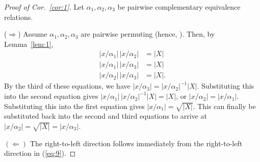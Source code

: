 \begin{proof}[Proof of Cor.~\ref{cor:1}]
Let $\alpha_1, \alpha_2, \alpha_3$ be pairwise complementary equivalence relations.

\noindent ($\Rightarrow$)
Assume $\alpha_1, \alpha_2, \alpha_3$ are pairwise permuting (hence, \pppc). Then, by Lemma~\ref{lem:1},
\begin{align*}
|x/\alpha_1|\, |x/\alpha_2| &= |X|\\
|x/\alpha_1|\, |x/\alpha_3| &= |X|\\
|x/\alpha_2|\, |x/\alpha_3| &= |X|.
\end{align*}
By the third of these equations, we have 
$|x/\alpha_3| = |x/\alpha_2|^{-1} |X|$.
Substituting this into the second equation gives 
$|x/\alpha_1|\, |x/\alpha_2|^{-1} |X| = |X|$,
or $|x/\alpha_2|= |x/\alpha_1|$.
Substituting this into the first equation gives 
$|x/\alpha_1|= \sqrt{|X|}$. This can finally be substituted
back into the second and third
equations to arrive at $|x/\alpha_2|= \sqrt{|X|} = |x/\alpha_3|$.


\noindent $(\Leftarrow)$ The right-to-left direction follows immediately from 
the right-to-left direction in (\ref{eq:9}).
\end{proof}

